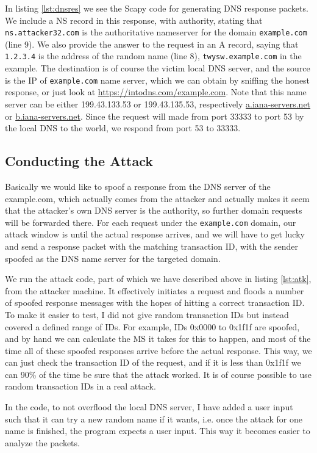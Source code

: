 \documentclass[12pt,reqno]{amsart}
\newcommand{\code}[1]{\texttt{#1}}
\begin{document}
 In listing \ref{lst:dnsres} we see the Scapy code for generating DNS response packets. We include a NS record in this response, with authority, stating that \code{ns.attacker32.com} is the authoritative nameserver for the domain \code{example.com} (line 9). We also provide the answer to the request in an A record, saying that \code{1.2.3.4} is the address of the random name (line 8), \code{twysw.example.com} in the example. The destination is of course the victim local DNS server, and the source is the IP of \code{example.com} name server, which we can obtain by sniffing the honest response, or just look at \url{https://intodns.com/example.com}. Note that this name server can be either 199.43.133.53 or 199.43.135.53, respectively \url{a.iana-servers.net} or \url{b.iana-servers.net}. Since the request will made from port 33333 to port 53 by the local DNS to the world, we respond from port 53 to 33333.
 
 
 \subsection*{Conducting the Attack}
 Basically we would like to spoof a response from the DNS server of the example.com, which actually comes from the attacker and actually makes it seem that the attacker's own DNS server is the authority, so further domain requests will be forwarded there. For each request under the \code{example.com} domain, our attack window is until the actual response arrives, and we will have to get lucky and send a response packet with the matching transaction ID, with the sender spoofed as the DNS name server for the targeted domain.
 
 We run the attack code, part of which we have described above in listing \ref{lst:atk}, from the attacker machine. It effectively initiates a request and floods a number of spoofed response messages with the hopes of hitting a correct transaction ID. To make it easier to test, I did not give random transaction IDs but instead covered a defined range of IDs. For example, IDs 0x0000 to 0x1f1f are spoofed, and by hand we can calculate the MS it takes for this to happen, and most of the time all of these spoofed responses arrive before the actual response. This way, we can just check the transaction ID of the request, and if it is less than 0x1f1f we can 90\% of the time be sure that the attack worked. It is of course possible to use random transaction IDs in a real attack.
 
In the code, to not overflood the local DNS server, I have added a user input such that it can try a new random name if it wants, i.e. once the attack for one name is finished, the program expects a user input. This way it becomes easier to analyze the packets.
 
\end{document}
